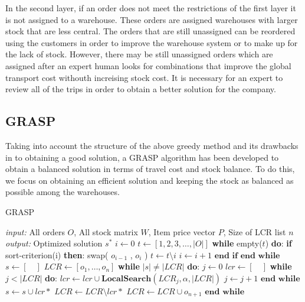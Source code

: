 \documentclass[letterpaper]{article} %
\begin{document}
In the second layer, if an order does not meet the restrictions of the first layer it is not assigned to a warehouse. These orders are assigned warehouses with larger stock that are less central. The orders that are still unassigned can be reordered using the customers in order to improve the warehouse system or to make up for the lack of stock. However, there may be still unassigned orders which are assigned after an expert human looks for combinations that improve the global transport cost withouth increising stock cost.
It is necessary for an expert to review all of the trips in order to obtain a better solution for the company.

\subsection*{GRASP}

Taking into account the structure of the above greedy method and its drawbacks in to obtaining a good solution, a GRASP algorithm has been developed to obtain a balanced solution in terms of travel cost and stock balance. To do this, we focus on obtaining an efficient solution and keeping the stock as balanced as possible among the warehouses.

\begin{algorithm}[H]
    \caption{GRASP}
    \label{alg:GRASP}
    \begin{algorithmic}[1] \label{code:grasp}
        \STATE \textit{input: } All orders $O$, All stock matrix $W$, Item price vector $P$, Size of LCR list $n$
        \STATE \textit{output: } Optimized solution $s^*$
        \STATE $i \longleftarrow 0 $
        \STATE $ t \longleftarrow [1,2,3,\dots,|O|]$
        \STATE \textbf{while} empty($t$) \textbf{do}: \label{1order}
        \STATE \quad \textbf{if} sort-criterion(i) \textbf{then}: \label{sort-criterion}
        \STATE \quad \quad swap( $ o_{i-1}$ , $ o_{i} $ )
        \STATE \quad \quad $t \longleftarrow t \setminus i$
        \STATE \quad \quad $i \longleftarrow i + 1$
        \STATE \quad $\textbf{end if}$
        \STATE $\textbf{end while}$ \label{2order}
        \STATE
        \STATE $s \longleftarrow [\quad] $
        \STATE $LCR \longleftarrow [o_1,\dots,o_n]$
        \STATE \textbf{while } $|s| \neq |LCR|$ \textbf{do}:\label{1grasp}
        \STATE \quad $j \longleftarrow 0 $
        \STATE \quad $lcr \longleftarrow [\quad]$
        \STATE \quad \textbf{while } $j < |LCR|$ \textbf{do}:
        \STATE \quad \quad $lcr \longleftarrow lcr \cup \textbf{LocalSearch}(LCR_j,\alpha,|LCR|)$
        \STATE \quad \quad $j \longleftarrow j + 1$
        \STATE \quad $\textbf{end while}$
        \STATE \quad $s \longleftarrow s \cup lcr*$ 
        \STATE \quad $LCR \longleftarrow LCR \setminus lcr*$ 
        \STATE \quad $LCR \longleftarrow LCR \cup  o_{n+1} $ 
        \STATE $\textbf{end while}$\label{2grasp}
    \end{algorithmic}
\end{algorithm}
\end{document}
